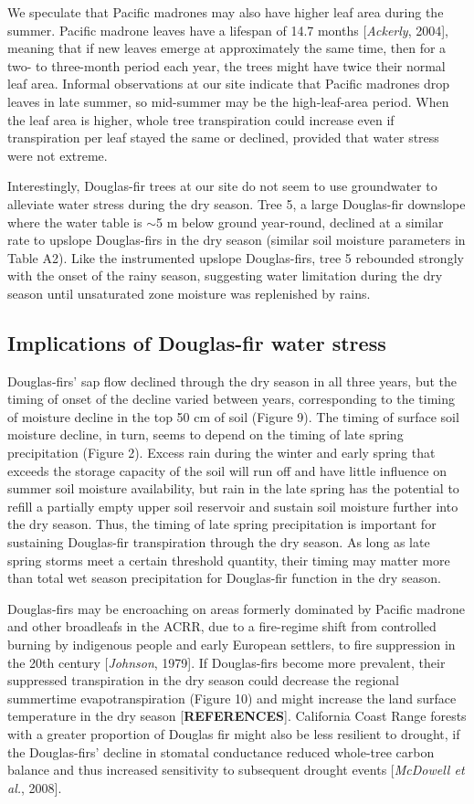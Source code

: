 We speculate that Pacific madrones may also have higher leaf area during the summer.  Pacific madrone leaves have a lifespan of 14.7 months [\textit{Ackerly}, 2004], meaning that if new leaves emerge at approximately the same time, then for a two- to three-month period each year, the trees might have twice their normal leaf area.  Informal observations at our site indicate that Pacific madrones drop leaves in late summer, so mid-summer may be the high-leaf-area period.  When the leaf area is higher, whole tree transpiration could increase even if transpiration per leaf stayed the same or declined, provided that water stress were not extreme.

Interestingly, Douglas-fir trees at our site do not seem to use groundwater to alleviate water stress during the dry season.  Tree 5, a large Douglas-fir downslope where the water table is $\sim$5 m below ground year-round, declined at a similar rate to upslope Douglas-firs in the dry season (similar soil moisture parameters in Table A2).  Like the instrumented upslope Douglas-firs, tree 5 rebounded strongly with the onset of the rainy season, suggesting water limitation during the dry season until unsaturated zone moisture was replenished by rains.

\subsection{Implications of Douglas-fir water stress}
Douglas-firs' sap flow declined through the dry season in all three years, but the timing of onset of the decline varied between years, corresponding to the timing of moisture decline in the top 50 cm of soil (Figure 9).  The timing of surface soil moisture decline, in turn, seems to depend on the timing of late spring precipitation (Figure 2).  Excess rain during the winter and early spring that exceeds the storage capacity of the soil will run off and have little influence on summer soil moisture availability, but rain in the late spring has the potential to refill a partially empty upper soil reservoir and sustain soil moisture further into the dry season.  Thus, the timing of late spring precipitation is important for sustaining Douglas-fir transpiration through the dry season.  As long as late spring storms meet a certain threshold quantity, their timing may matter more than total wet season precipitation for Douglas-fir function in the dry season.

Douglas-firs may be encroaching on areas formerly dominated by Pacific madrone and other broadleafs in the ACRR, due to a fire-regime shift from controlled burning by indigenous people and early European settlers, to fire suppression in the 20th century [\textit{Johnson}, 1979].  If Douglas-firs become more prevalent, their suppressed transpiration in the dry season could decrease the regional summertime evapotranspiration (Figure 10) and might increase the land surface temperature in the dry season [\textbf{REFERENCES}].  California Coast Range forests with a greater proportion of Douglas fir might also be less resilient to drought, if the Douglas-firs' decline in stomatal conductance reduced whole-tree carbon balance and thus increased sensitivity to subsequent drought events [\textit{McDowell et al.}, 2008].


